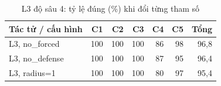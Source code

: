 \begin{table}[H]
  \centering
  \small
  \caption{L3 độ sâu 4: tỷ lệ đúng (\%) khi đổi từng tham số}
  \label{tab:cs-ct-l3bien}
  \begin{tabular}{lrrrrrr}
    \toprule
    Tác tử / cấu hình & C1 & C2 & C3 & C4 & C5 & Tổng \\
    \midrule
    L3, no\_forced & 100 & 100 & 100 & 86 & 98 & 96,8 \\
    L3, no\_defense & 100 & 100 & 100 & 87 & 95 & 96,4 \\
    L3, radius=1 & 100 & 100 & 100 & 80 & 97 & 95,4 \\
    \bottomrule
  \end{tabular}
\end{table}
